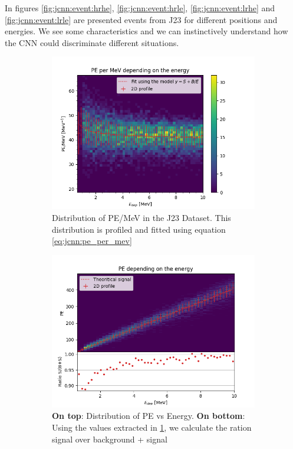 In figures \ref{fig:jcnn:event:hrhe}, \ref{fig:jcnn:event:hrle}, \ref{fig:jcnn:event:lrhe} and \ref{fig:jcnn:event:lrle} are presented events from J23 for different positions and energies. We see some characteristics and we can instinctively understand how the CNN could discriminate different situations.

\begin{figure}[ht]
  \begin{subfigure}[t]{0.48\linewidth}
    \centering
    \includegraphics[width=\textwidth]{images/jcnn/pe_mev.png}
    \caption{Distribution of PE/MeV in the J23 Dataset. This distribution is profiled and fitted using equation \ref{eq:jcnn:pe_per_mev}}
    \label{fig:jcnn:pe_per_mev}
  \end{subfigure}
  \hfill
  \begin{subfigure}[t]{0.48\linewidth}
    \centering
    \includegraphics[width=\textwidth]{images/jcnn/pe_vs_mev.png}
    \caption{\textbf{On top}: Distribution of PE vs Energy. \textbf{On bottom}: Using the values extracted in \ref{fig:jcnn:pe_per_mev}, we calculate the ration signal over background + signal}
    \label{fig:jcnn:pe_vs_mev}
  \end{subfigure}
  \caption{}
\end{figure}

